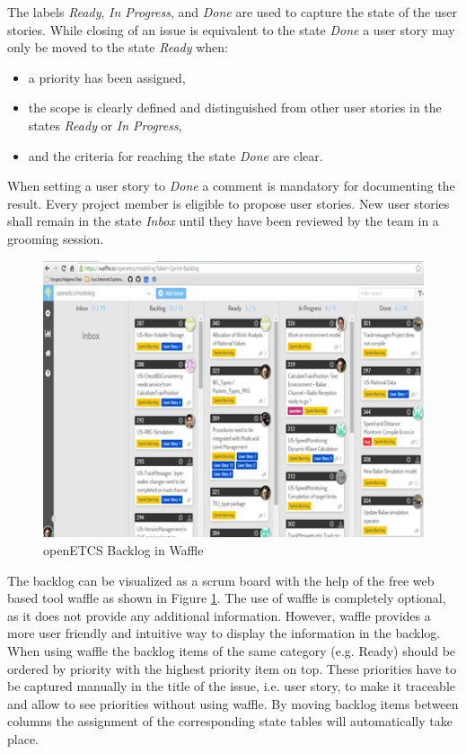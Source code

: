The labels \textit{Ready}, \textit{In Progress}, and \textit{Done} are used to capture the state of the user stories. While closing of an issue is equivalent to the state \textit{Done} a user story may only be moved to the state \textit{Ready} when:
\begin{itemize}
\item a priority has been assigned,
\item the scope is clearly defined and distinguished from other user stories in the states \textit{Ready} or \textit{In Progress},
\item and the criteria for reaching the state \textit{Done} are clear.
\end{itemize}
When setting a user story to \textit{Done} a comment is mandatory for documenting the result. Every project member is eligible to propose user stories. New user stories shall remain in the state  \textit{Inbox} until they have been reviewed by the team in a grooming session. 

\begin{figure}[h]
	\centering
	\includegraphics[width=0.8\linewidth]{images/ScrumBoard_Wffle}
	\caption{openETCS Backlog in Waffle}
	\label{fig:WaffleBacklog}
\end{figure}
	

The backlog can be visualized as a scrum board with the help of the free web based tool waffle as shown in Figure \ref{fig:WaffleBacklog}. The use of waffle is completely optional, as it does not provide any additional information. However, waffle provides a more user friendly and intuitive way to display the information in the backlog. When using waffle the backlog items of the same category (e.g. Ready) should be ordered by priority with the highest priority item on top. These priorities have to be captured manually in the title of the issue, i.e. user story, to make it traceable and allow to see priorities without using waffle. By moving backlog items between columns the assignment of the corresponding state tables will automatically take place. 

